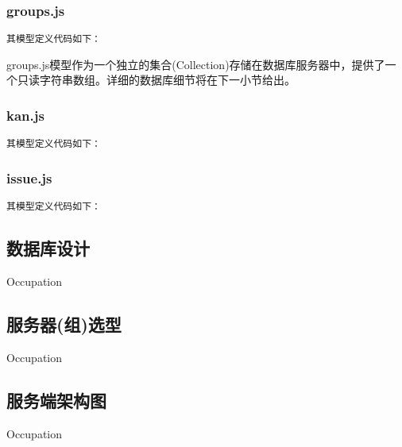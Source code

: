 \subsubsection{groups.js}

\noindent
\texttt{\large 其模型定义代码如下：}


\noindent
groups.js模型作为一个独立的集合(Collection)存储在数据库服务器中，提供了一个只读字符串数组。详细的数据库细节将在下一小节给出。

\subsubsection{kan.js}

\noindent
\texttt{\large 其模型定义代码如下：}


\subsubsection{issue.js}

\noindent
\texttt{\large 其模型定义代码如下：}


\subsection{数据库设计}
\indent
Occupation

\subsection{服务器(组)选型}
\indent
Occupation

\subsection{服务端架构图}
\indent
Occupation


\clearpage